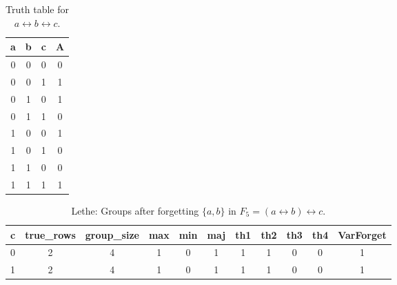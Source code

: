 \begin{table}[!tb]
    \centering
    \begin{tabular}{|c|c|c|c|}
        \hline
        \textbf{a} & \textbf{b} & \textbf{c} & \textbf{A} \\ \hline
        0 & 0 & 0 & 0 \\ \hline
        0 & 0 & 1 & 1 \\ \hline
        0 & 1 & 0 & 1 \\ \hline
        0 & 1 & 1 & 0 \\ \hline
        1 & 0 & 0 & 1 \\ \hline
        1 & 0 & 1 & 0 \\ \hline
        1 & 1 & 0 & 0 \\ \hline
        1 & 1 & 1 & 1 \\ \hline
    \end{tabular}
    \caption{Truth table for $a \leftrightarrow b \leftrightarrow c$.}
    \label{tab:truthtab}
\end{table}

\begin{table}[!tb]
    \centering
    \begin{tabular}{|c|c|c|c|c|c|c|c|c|c|c|}
        \hline
        \textbf{c} & \textbf{true\_rows} & \textbf{group\_size} & \textbf{max} & \textbf{min} & \textbf{maj} & \textbf{th1} & \textbf{th2} & \textbf{th3} & \textbf{th4} & \textbf{VarForget} \\ \hline
        \rowcolor{gray!40} 0 & 2 & 4 & 1 & 0 & 1 & 1 & 1 & 0 & 0 & 1 \\ \hline
        \rowcolor{blue!40} 1 & 2 & 4 & 1 & 0 & 1 & 1 & 1 & 0 & 0 & 1 \\ \hline
    \end{tabular}
    \caption{Lethe: Groups after forgetting $\{a, b\}$ in $F_{5} = (a \leftrightarrow b) \leftrightarrow c$.}
    \label{tab:lethe-F5-ab-groups}
\end{table}
